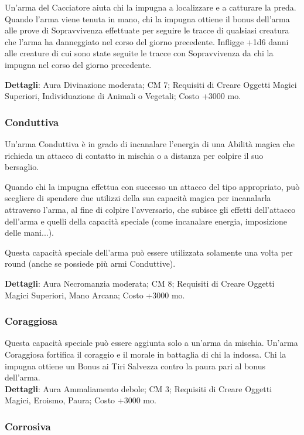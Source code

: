 \begin{multicols}{2}
Un'arma del Cacciatore aiuta chi la impugna a localizzare e a catturare la preda. Quando l'arma viene tenuta in mano, chi la impugna ottiene il bonus dell'arma alle prove di Sopravvivenza effettuate per seguire le tracce di qualsiasi creatura che l'arma ha danneggiato nel corso del giorno precedente. Infligge +1d6 danni alle creature di cui sono state seguite le tracce con Sopravvivenza da chi la impugna nel corso del giorno precedente.

\textbf{Dettagli}: Aura Divinazione moderata; CM 7; Requisiti di Creare Oggetti Magici Superiori, Individuazione di Animali o Vegetali; Costo +3000 mo.

\subsubsection{Conduttiva}

Un'arma Conduttiva è in grado di incanalare l'energia di una Abilità magica che richieda un attacco di contatto in mischia o a distanza per colpire il suo bersaglio. 

Quando chi la impugna effettua con successo un attacco del tipo appropriato, può scegliere di spendere due utilizzi della sua capacità magica per incanalarla attraverso l'arma, al fine di colpire l'avversario, che subisce gli effetti dell'attacco dell'arma e quelli della capacità speciale (come incanalare energia, imposizione delle mani...).

Questa capacità speciale dell'arma può essere utilizzata solamente una volta per round (anche se possiede più armi Conduttive).

\textbf{Dettagli}: Aura Necromanzia moderata; CM 8; Requisiti di Creare Oggetti Magici Superiori, Mano Arcana; Costo +3000 mo.


\subsubsection{Coraggiosa}

Questa capacità speciale può essere aggiunta solo a un'arma da mischia. Un'arma Coraggiosa fortifica il coraggio e il morale in battaglia di chi la indossa. Chi la impugna ottiene un Bonus ai Tiri Salvezza contro la paura pari al bonus dell'arma.\\ 

\textbf{Dettagli}: Aura Ammaliamento debole; CM 3; Requisiti di Creare Oggetti Magici, Eroismo, Paura; Costo +3000 mo.

\subsubsection{Corrosiva}


\end{multicols}
